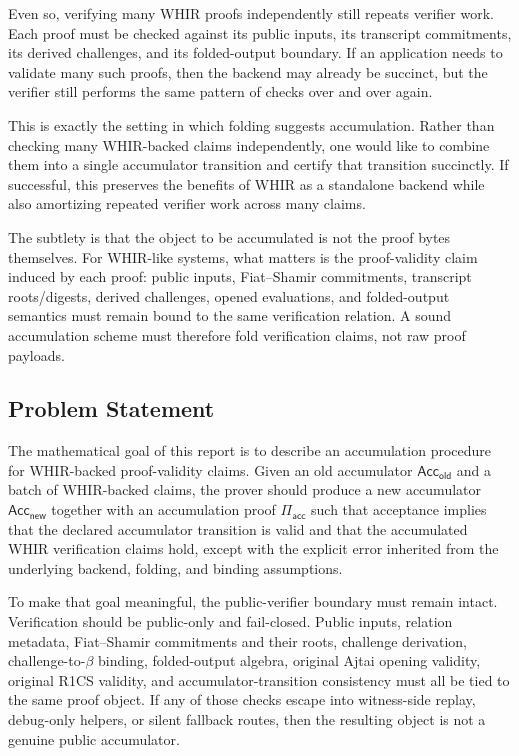 \documentclass[11pt]{article}
\theoremstyle{definition}
\newcommand{\Acc}{\mathsf{Acc}}
\begin{document}
Even so, verifying many WHIR proofs independently still repeats verifier work.
Each proof must be checked against its public inputs, its transcript commitments,
its derived challenges, and its folded-output boundary. If an application needs to
validate many such proofs, then the backend may already be succinct, but the
verifier still performs the same pattern of checks over and over again.

This is exactly the setting in which folding suggests accumulation. Rather than
checking many WHIR-backed claims independently, one would like to combine them
into a single accumulator transition and certify that transition succinctly. If
successful, this preserves the benefits of WHIR as a standalone backend while also
amortizing repeated verifier work across many claims.

The subtlety is that the object to be accumulated is not the proof bytes themselves.
For WHIR-like systems, what matters is the proof-validity claim induced by each
proof: public inputs, Fiat--Shamir commitments, transcript
roots/digests, derived challenges, opened evaluations, and folded-output
semantics must remain bound to the same verification relation. A sound
accumulation scheme must therefore fold verification claims, not raw proof
payloads.

\subsection{Problem Statement}
\label{sec:problem-statement}

The mathematical goal of this report is to describe an accumulation procedure for
WHIR-backed proof-validity claims. Given an old accumulator
$\Acc_{\mathsf{old}}$ and a batch of WHIR-backed claims, the prover should produce
a new accumulator $\Acc_{\mathsf{new}}$ together with an accumulation proof
$\Pi_{\mathsf{acc}}$ such that acceptance implies that the declared accumulator
transition is valid and that the accumulated WHIR verification claims hold,
except with the explicit error inherited from the underlying backend, folding,
and binding assumptions.

To make that goal meaningful, the public-verifier boundary must remain intact.
Verification should be public-only and fail-closed. Public inputs, relation
metadata, Fiat--Shamir commitments and their roots, challenge derivation,
challenge-to-$\beta$ binding, folded-output algebra, original Ajtai opening
validity, original R1CS validity, and accumulator-transition consistency must all
be tied to the same proof object. If any of those checks escape into witness-side
replay, debug-only helpers, or silent fallback routes, then the resulting object
is not a genuine public accumulator.
\end{document}
